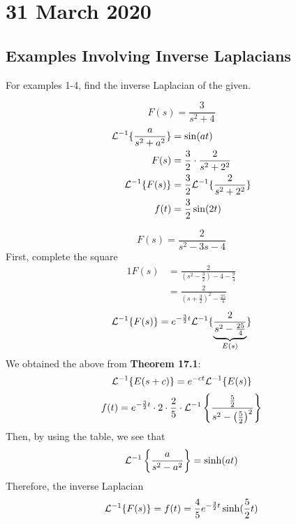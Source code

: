\documentclass[diffeq.tex]{subfiles}
\begin{document}
\chapter{31 March 2020}
    \section{Examples Involving Inverse Laplacians}
    For examples 1-4, find the inverse Laplacian of the given.
    \begin{example}
        \begin{equation}
            F(s) = \frac{3}{s^{2} + 4}
        \end{equation}
        \begin{alignat}{1}
            \mathcal{L}^{-1}\{\frac{a}{s^{2} + a^{2}}\} &= \sin(at)\\
            F(s) &= \frac{3}{2} \cdot \frac{2}{s^{2} + 2^{2}}\\
            \mathcal{L}^{-1}\{F(s)\} &= \frac{3}{2}\mathcal{L}^{-1}\{\frac{2}{s^{2} + 2^{2}}\}\\
            f(t) &= \frac{3}{2}\sin(2t)
        \end{alignat}
    \end{example}
    \begin{example}
        \begin{equation}
            F(s) = \frac{2}{s^{2} - 3s - 4}
        \end{equation}
        First, complete the square
        \begin{alignat}{1}
            F(s) &= \frac{2}{\left(s^{2} - \frac{3}{2}\right) - 4 - \frac{9}{4}}\\
            &= \frac{2}{\left(s + \frac{3}{2}\right)^{2} - \frac{25}{4}}
        \end{alignat}
        \begin{equation}
            \mathcal{L}^{-1}\{F(s)\} = e^{-\frac{3}{2}t}\mathcal{L}^{-1}\{\underbrace{\frac{2}{s^{2} - \frac{25}{4}}}_{E(s)}\}
        \end{equation}
        We obtained the above from \textbf{Theorem 17.1}:
        \begin{equation}
            \mathcal{L}^{-1}\{E(s + c)\} = e^{-ct}\mathcal{L}^{-1}\{E(s)\}
        \end{equation}
        \begin{alignat}{1}
            f(t) = e^{-\frac{3}{2}t}\cdot 2\cdot \frac{2}{5}\cdot \mathcal{L}^{-1}\left\{\frac{\frac{5}{2}}{s^{2} - \left(\frac{5}{2}\right)^{2}}\right\}
        \end{alignat}
        Then, by using the table, we see that
        \begin{equation}
            \mathcal{L}^{-1}\left\{\frac{a}{s^{2} - a^{2}}\right\} = \sinh(at)
        \end{equation}
        Therefore, the inverse Laplacian
        \begin{equation}
            \mathcal{L}^{-1}\{F(s)\} = f(t) = \frac{4}{5}e^{-\frac{3}{2}t}\sinh(\frac{5}{2}t)
        \end{equation}
    \end{example}
\end{document}
